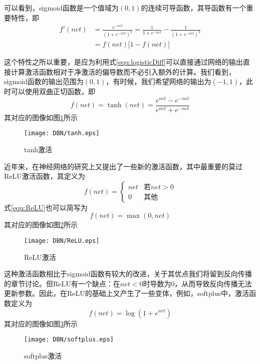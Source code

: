 可以看到，sigmoid函数是一个值域为$(0,1)$的连续可导函数，其导函数有一个重要特性，即
\begin{equation}
\begin{split}
f'(net) &= \frac{e^{-net}}{(1 + e^{-net})^2} = \frac{1}{1+ e^{-net}} -  \frac{1}{(1+ e^{-net})^2}\\
&=f(net)\Big[1 - f(net)\Big]
\end{split}
\label{equ:logisticDiff}
\end{equation}

这个特性之所以重要，是应为利用式\eqref{equ:logisticDiff}可以直接通过网络的输出直接计算激活函数相对于净激活的偏导数而不必引入额外的计算。我们看到，sigmoid函数的输出范围为$(0,1)$，有时候，我们希望网络的输出为$(-1,1)$，此时可以使用双曲正切函数，即
\begin{equation}
f(net) = \tanh(net) = \frac{e^{net} - e^{-net}}{e^{net} + e^{-net}}
\end{equation}
其对应的图像如图\ref{img:tanh}所示
\begin{figure}[!htbp]
\centering
\texttt{[image: DBN/tanh.eps]}
\caption{tanh激活}
\label{img:tanh}
\end{figure}

近年来，在神经网络的研究上又提出了一些新的激活函数，其中最重要的莫过ReLU激活函数，其定义为
\begin{equation}
f(net) = \left\{
\begin{array}{cc}
net & \text{若}net > 0\\
0 & \text{其他}
\end{array}
\right.
\label{equ:ReLU}
\end{equation}
式\eqref{equ:ReLU}也可以简写为
\begin{equation}
f(net) = \max (0, net)
\end{equation}
其对应的图像如图\ref{img:ReLU}所示
\begin{figure}[!htbp]
\centering
\texttt{[image: DBN/ReLU.eps]}
\caption{ReLU激活}
\label{img:ReLU}
\end{figure}

这种激活函数相比于sigmoid函数有较大的改进，关于其优点我们将留到反向传播的章节讨论。但ReLU有一个缺点：在$net<0$时导数为0，从而导致反向传播无法更新参数。因此，在ReLU的基础上又产生了一些变体，例如，softplus中，激活函数定义为
\begin{equation}
f(net) = \log(1+e^{net})
\end{equation}
其对应的图像如图\ref{img:softplus}所示
\begin{figure}[!htbp]
\centering
\texttt{[image: DBN/softplus.eps]}
\caption{softplus激活}
\label{img:softplus}
\end{figure}


